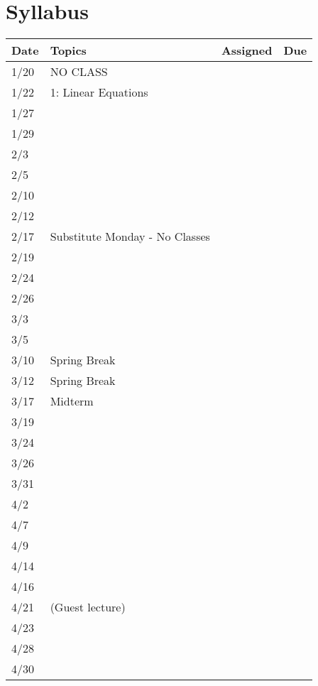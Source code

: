 \documentclass[11pt]{article}
\begin{document}
\newpage
\section*{Syllabus}

\small
\begin{centering}
\begin{tabular}{||l|p{3in}|l|l||}
\hline\hline
Date & Topics  & Assigned & Due  \\
\hline\hline
1/20 & NO CLASS && \\
1/22 & 1: Linear Equations &  & \\
\hline

1/27 & & & \\
1/29 & & & \\
\hline

2/3 & & & \\
2/5 & & & \\
\hline

2/10 & & & \\
2/12 & & & \\
\hline

2/17 & Substitute Monday - No Classes & & \\
2/19 & & & \\
\hline

2/24 & & & \\
2/26 & & & \\
\hline

3/3 & & & \\
3/5 & & & \\
\hline

3/10 & Spring Break &&\\
3/12 & Spring Break &&\\
\hline

3/17 & Midterm & & \\
3/19 & & & \\
\hline

3/24 & & & \\
3/26 & & & \\
\hline

3/31 & & & \\
4/2 & & & \\
\hline

4/7 & & & \\
4/9 & & & \\
\hline

4/14 & & & \\
4/16 & & & \\
 \hline

4/21 & (Guest lecture) & & \\
4/23 & & & \\
\hline

4/28 & & & \\
4/30 & & & \\
\hline\hline

\end{tabular}\\
\end{centering}
\end{document}
